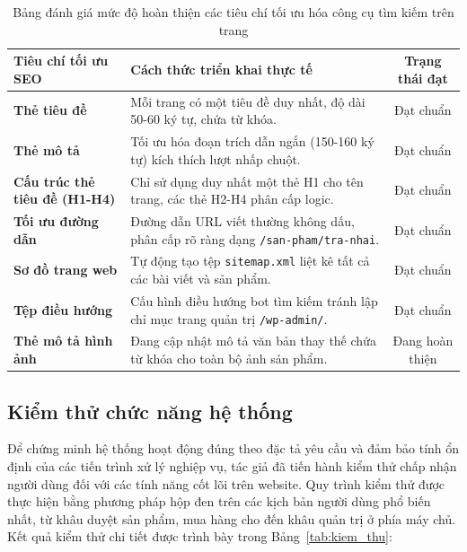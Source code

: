 \begin{table}[H]
    \centering
    \caption{Bảng đánh giá mức độ hoàn thiện các tiêu chí tối ưu hóa công cụ tìm kiếm trên trang}
    \label{tab:seo_audit}
    \begin{tabular}{p{4.5cm} p{7cm} c}
        \toprule
        \textbf{Tiêu chí tối ưu SEO} & \textbf{Cách thức triển khai thực tế} & \textbf{Trạng thái đạt} \\
        \midrule
        \textbf{Thẻ tiêu đề} & Mỗi trang có một tiêu đề duy nhất, độ dài 50-60 ký tự, chứa từ khóa. & Đạt chuẩn \\
        \textbf{Thẻ mô tả} & Tối ưu hóa đoạn trích dẫn ngắn (150-160 ký tự) kích thích lượt nhấp chuột. & Đạt chuẩn \\
        \textbf{Cấu trúc thẻ tiêu đề (H1-H4)} & Chỉ sử dụng duy nhất một thẻ H1 cho tên trang, các thẻ H2-H4 phân cấp logic. & Đạt chuẩn \\
        \textbf{Tối ưu đường dẫn} & Đường dẫn URL viết thường không dấu, phân cấp rõ ràng dạng \texttt{/san-pham/tra-nhai}. & Đạt chuẩn \\
        \textbf{Sơ đồ trang web} & Tự động tạo tệp \texttt{sitemap.xml} liệt kê tất cả các bài viết và sản phẩm. & Đạt chuẩn \\
        \textbf{Tệp điều hướng} & Cấu hình điều hướng bot tìm kiếm tránh lập chỉ mục trang quản trị \texttt{/wp-admin/}. & Đạt chuẩn \\
        \textbf{Thẻ mô tả hình ảnh} & Đang cập nhật mô tả văn bản thay thế chứa từ khóa cho toàn bộ ảnh sản phẩm. & Đang hoàn thiện \\
        \bottomrule
    \end{tabular}
\end{table}

\subsection{Kiểm thử chức năng hệ thống}

Để chứng minh hệ thống hoạt động đúng theo đặc tả yêu cầu và đảm bảo tính ổn định của các tiến trình xử lý nghiệp vụ, tác giả đã tiến hành kiểm thử chấp nhận người dùng đối với các tính năng cốt lõi trên website. Quy trình kiểm thử được thực hiện bằng phương pháp hộp đen trên các kịch bản người dùng phổ biến nhất, từ khâu duyệt sản phẩm, mua hàng cho đến khâu quản trị ở phía máy chủ. Kết quả kiểm thử chi tiết được trình bày trong Bảng~\ref{tab:kiem_thu}:

